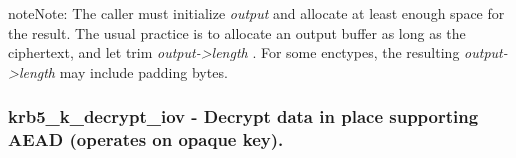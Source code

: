 \documentclass[letterpaper,10pt,english]{sphinxmanual}
\begin{document}
\begin{notice}{note}{Note:}
The caller must initialize \emph{output} and allocate at least enough space for the result. The usual practice is to allocate an output buffer as long as the ciphertext, and let {\hyperref[appdev/refs/api/krb5_c_decrypt:c.krb5_c_decrypt]{}} trim \emph{output-\textgreater{}length} . For some enctypes, the resulting \emph{output-\textgreater{}length} may include padding bytes.
\end{notice}


\subsubsection{krb5\_k\_decrypt\_iov -  Decrypt data in place supporting AEAD (operates on opaque key).}
\label{appdev/refs/api/krb5_k_decrypt_iov::doc}\label{appdev/refs/api/krb5_k_decrypt_iov:krb5-k-decrypt-iov-decrypt-data-in-place-supporting-aead-operates-on-opaque-key}

\begin{fulllineitems}
\label{appdev/refs/api/krb5_k_decrypt_iov:c.krb5_k_decrypt_iov}
\end{fulllineitems}
\end{document}
